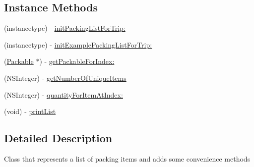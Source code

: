 \subsection*{Instance Methods}
\begin{DoxyCompactItemize}
\item 
(instancetype) -\/ \hyperlink{interface_packing_list_ad2a2047f09bda181d360593acb068cab}{init\-Packing\-List\-For\-Trip\-:}
\item 
(instancetype) -\/ \hyperlink{interface_packing_list_a1a06132f16892f9379ded65f2365362b}{init\-Example\-Packing\-List\-For\-Trip\-:}
\item 
(\hyperlink{interface_packable}{Packable} $\ast$) -\/ \hyperlink{interface_packing_list_a09a1d6b99216336d3de2f1d39983e4fd}{get\-Packable\-For\-Index\-:}
\item 
(N\-S\-Integer) -\/ \hyperlink{interface_packing_list_abc46addde8828e6e414100851eac731e}{get\-Number\-Of\-Unique\-Items}
\item 
(N\-S\-Integer) -\/ \hyperlink{interface_packing_list_a4b7a74a055c78ad2c84365b9fd2567cd}{quantity\-For\-Item\-At\-Index\-:}
\item 
(void) -\/ \hyperlink{interface_packing_list_a91482348b38c1a7762a08e914306714f}{print\-List}
\end{DoxyCompactItemize}


\subsection{Detailed Description}
Class that represents a list of packing items and adds some convenience methods 

